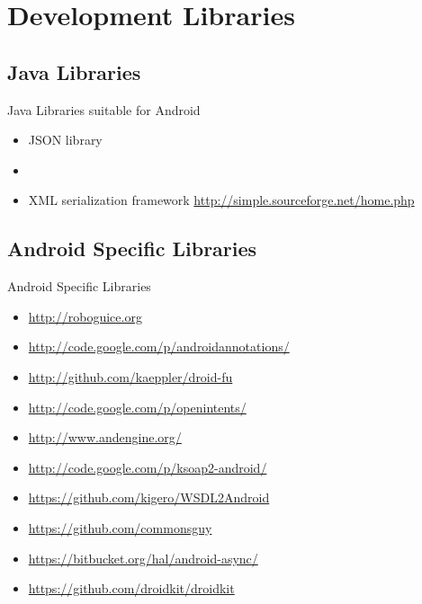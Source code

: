 \documentclass[aspectratio=169]{beamer}
\newcommand{\surl}[1] {{\tiny \url{#1}}}
\begin{document}
\section{Development Libraries}

  \subsection{Java Libraries}

    \begin{frame}{Java Libraries suitable for Android}
      \begin{itemize}
        \item<1->[jackson] JSON library 
        \item<2->[gson] 
        
        \item<3->[SimpleXML] XML serialization framework \surl{http://simple.sourceforge.net/home.php}
        
      \end{itemize}
    \end{frame}

  \subsection{Android Specific Libraries}

    \begin{frame}{Android Specific Libraries}
      \begin{itemize}
        \item<1->[Roboguice] \surl{http://roboguice.org} 
        \item<2->[AndroidAnnotations] \surl{http://code.google.com/p/androidannotations/}
        \item<3->[DroidFu] \surl{http://github.com/kaeppler/droid-fu}
        \item<4->[OpenIntents] \surl{http://code.google.com/p/openintents/}
        \item<5->[AndEngine] \surl{http://www.andengine.org/}
        \item<6->[ksoap2-android] \surl{http://code.google.com/p/ksoap2-android/}
        \item<7->[WSDL2Android] \surl{https://github.com/kigero/WSDL2Android}
        \item<8->[CommonsWare Android Components CWAC] \surl{https://github.com/commonsguy}  
        \item<9->[AndroidAsync] \surl{https://bitbucket.org/hal/android-async/}  
        \item<10->[DroidKit] \surl{https://github.com/droidkit/droidkit}
      \end{itemize}
    \end{frame}
\end{document}

